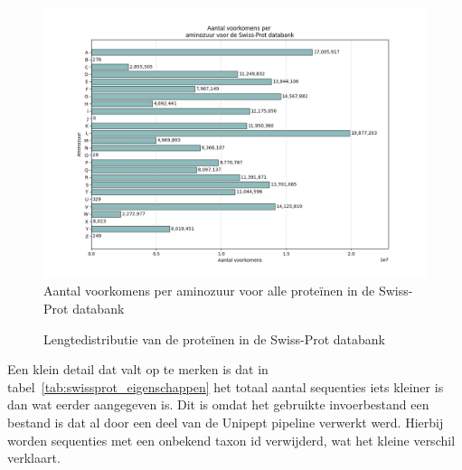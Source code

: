 \documentclass[11pt,dutch,faculty=we,layout=titlefont,underline=false,titleUppercase=true,titleUnderline=true]{ugent2016-report}
\begin{document}
    \begin{figure}[H]
        \centering
        \includegraphics[width=0.7\linewidth]{swissprot_aminozuur_voorkomens}
        \caption{Aantal voorkomens per aminozuur voor alle proteïnen in de Swiss-Prot databank}
        \label{fig:swissprot_aminozuur}
    \end{figure}

    \begin{figure}[H]
        \centering
        \caption{Lengtedistributie van de proteïnen in de Swiss-Prot databank}\label{fig:swissprot_length}
    \end{figure}

    Een klein detail dat valt op te merken is dat in tabel~\ref{tab:swissprot_eigenschappen} het totaal aantal sequenties iets kleiner is dan wat eerder aangegeven is.
    Dit is omdat het gebruikte invoerbestand een bestand is dat al door een deel van de Unipept pipeline verwerkt werd.
    Hierbij worden sequenties met een onbekend taxon id verwijderd, wat het kleine verschil verklaart.
\end{document}
